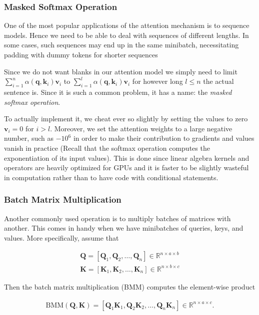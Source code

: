 \documentclass[a4paper,12pt]{article}
\theoremstyle{definition}
\begin{document}
\subsubsection*{Masked Softmax Operation}
One of the most popular applications of the attention mechanism is to sequence models. Hence we need to be able to deal with sequences of different lengths. In some cases,
such sequences may end up in the same minibatch, necessitating padding with dummy tokens for shorter sequences

Since we do not want blanks in our attention model we simply need to limit $\sum_{i=1}^n \alpha(\mathbf{q}, \mathbf{k}_i) \mathbf{v}_i$ to
$\sum_{i=1}^l \alpha(\mathbf{q}, \mathbf{k}_i) \mathbf{v}_i$
for however long $l \leq n$ the actual sentence is. Since it is such a common problem, it has a name: the \emph{masked softmax operation}.

To actually implement it, we cheat ever so slightly by setting the values to zero $\mathbf{v}_i = 0$ for $i > l$. Moreover, we set the attention weights to a large negative number,
such as $-10^6$ in order to make their contribution to gradients and values vanish in practice (Recall that the softmax operation computes the exponentiation of its input values).
This is done since linear algebra kernels and operators are heavily optimized for GPUs and it is faster to be slightly wasteful in computation rather than to have code with conditional statements.

\subsubsection*{Batch Matrix Multiplication}
Another commonly used operation is to multiply batches of matrices with another. This comes in handy when we have minibatches of queries, keys, and values. More specifically, assume that

\begin{align*}
    \mathbf{Q} = [\mathbf{Q}_1, \mathbf{Q}_2, \ldots, \mathbf{Q}_n]  \in \mathbb{R}^{n \times a \times b} \\
    \mathbf{K} = [\mathbf{K}_1, \mathbf{K}_2, \ldots, \mathbf{K}_n]  \in \mathbb{R}^{n \times b \times c}
\end{align*}

Then the batch matrix multiplication (BMM) computes the element-wise product

\begin{align*}
    \mathrm{BMM}(\mathbf{Q}, \mathbf{K}) = [\mathbf{Q}_1 \mathbf{K}_1, \mathbf{Q}_2 \mathbf{K}_2, \ldots, \mathbf{Q}_n \mathbf{K}_n] \in \mathbb{R}^{n \times a \times c}.
\end{align*}
\end{document}
